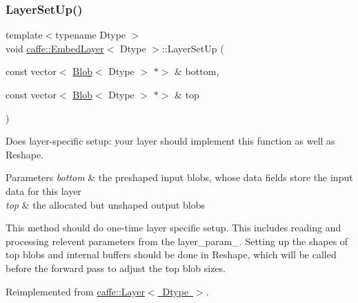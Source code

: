 \subsubsection{\texorpdfstring{Layer\+Set\+Up()}{LayerSetUp()}\hspace{0.1cm}{\footnotesize\ttfamily [1/2]}}
{\footnotesize\ttfamily template$<$typename Dtype $>$ \\
void \mbox{\hyperlink{classcaffe_1_1_embed_layer}{caffe\+::\+Embed\+Layer}}$<$ Dtype $>$\+::Layer\+Set\+Up (\begin{DoxyParamCaption}\item[{const vector$<$ \mbox{\hyperlink{classcaffe_1_1_blob}{Blob}}$<$ Dtype $>$ $\ast$$>$ \&}]{bottom,  }\item[{const vector$<$ \mbox{\hyperlink{classcaffe_1_1_blob}{Blob}}$<$ Dtype $>$ $\ast$$>$ \&}]{top }\end{DoxyParamCaption})\hspace{0.3cm}{\ttfamily [virtual]}}



Does layer-\/specific setup\+: your layer should implement this function as well as Reshape. 


\begin{DoxyParams}{Parameters}
{\em bottom} & the preshaped input blobs, whose data fields store the input data for this layer \\
\hline
{\em top} & the allocated but unshaped output blobs\\
\hline
\end{DoxyParams}
This method should do one-\/time layer specific setup. This includes reading and processing relevent parameters from the {\ttfamily layer\+\_\+param\+\_\+}. Setting up the shapes of top blobs and internal buffers should be done in {\ttfamily Reshape}, which will be called before the forward pass to adjust the top blob sizes. 

Reimplemented from \mbox{\hyperlink{classcaffe_1_1_layer_a481323a3e0972c682787f2137468c29f}{caffe\+::\+Layer$<$ Dtype $>$}}.

\mbox{\label{classcaffe_1_1_embed_layer_a1fecd89c503b59a952f80ff61d4253b3}} 
